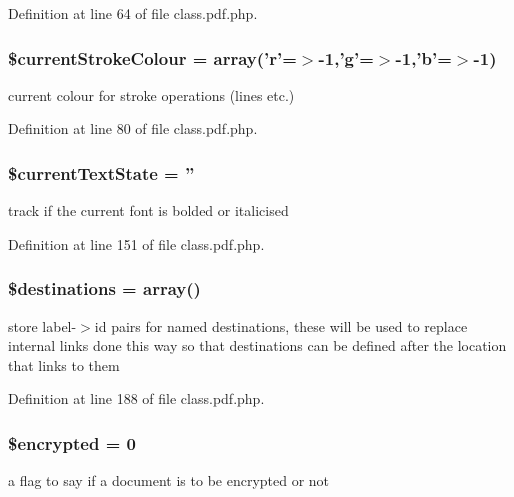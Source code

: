 \-Definition at line 64 of file class.\-pdf.\-php.

\hypertarget{class_cpdf_a9320b72ab89c1d8aeb76a607560f85a7}{
\subsubsection[{\$current\-Stroke\-Colour}]{\setlength{\rightskip}{0pt plus 5cm}\$current\-Stroke\-Colour = array('r'=$>$-\/1,'g'=$>$-\/1,'b'=$>$-\/1)}}\label{class_cpdf_a9320b72ab89c1d8aeb76a607560f85a7}
current colour for stroke operations (lines etc.) 

\-Definition at line 80 of file class.\-pdf.\-php.

\hypertarget{class_cpdf_ac7a9fec297babb986a440fa02032be15}{
\subsubsection[{\$current\-Text\-State}]{\setlength{\rightskip}{0pt plus 5cm}\$current\-Text\-State = ''}}\label{class_cpdf_ac7a9fec297babb986a440fa02032be15}
track if the current font is bolded or italicised 

\-Definition at line 151 of file class.\-pdf.\-php.

\hypertarget{class_cpdf_a122da4689a596dd289cea157977eb02c}{
\subsubsection[{\$destinations}]{\setlength{\rightskip}{0pt plus 5cm}\$destinations = array()}}\label{class_cpdf_a122da4689a596dd289cea157977eb02c}
store label-\/$>$id pairs for named destinations, these will be used to replace internal links done this way so that destinations can be defined after the location that links to them 

\-Definition at line 188 of file class.\-pdf.\-php.

\hypertarget{class_cpdf_a4ac37790931818c0ac730fa8b4e58760}{
\subsubsection[{\$encrypted}]{\setlength{\rightskip}{0pt plus 5cm}\$encrypted = 0}}\label{class_cpdf_a4ac37790931818c0ac730fa8b4e58760}
a flag to say if a document is to be encrypted or not 

